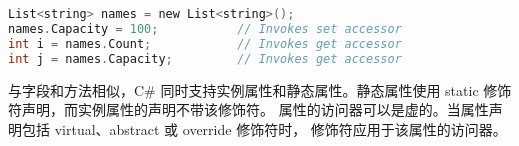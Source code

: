  \begin{lstlisting}[language=C]
List<string> names = new List<string>();
names.Capacity = 100;           // Invokes set accessor
int i = names.Count;            // Invokes get accessor
int j = names.Capacity;         // Invokes get accessor
 \end{lstlisting}

与字段和方法相似，C\# 同时支持实例属性和静态属性。静态属性使用 static 修饰符声明，而实例属性的声明不带该修饰符。
属性的访问器可以是虚的。当属性声明包括 virtual、abstract 或 override 修饰符时，
修饰符应用于该属性的访问器。


